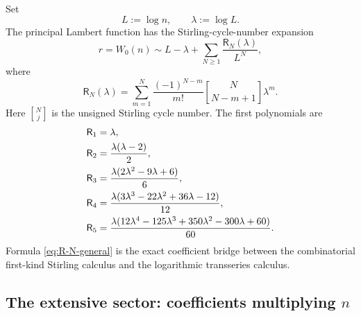 \documentclass[11pt,a4paper]{article}
\theoremstyle{definition}
\theoremstyle{remark}
\newcommand{\Sone}[2]{\genfrac{[}{]}{0pt}{}{#1}{#2}}
\newcommand{\cR}{\mathsf R}
\begin{document}
Set
\begin{equation}\label{eq:L-lambda}
  L:=\log n,
  \qquad \lambda:=\log L.
\end{equation}
The principal Lambert function has the Stirling-cycle-number expansion
\begin{equation}\label{eq:W-polylog}
 r=W_0(n)
 \sim L-\lambda+\sum_{N\ge1}\frac{\cR_N(\lambda)}{L^N},
\end{equation}
where
\begin{equation}\label{eq:R-N-general}
 \boxed{
 \cR_N(\lambda)=
 \sum_{m=1}^{N}
 \frac{(-1)^{N-m}}{m!}
 \Sone{N}{N-m+1}\lambda^m.}
\end{equation}
Here \(\Sone{N}{j}\) is the unsigned Stirling cycle number.  The first
polynomials are
\begin{align}
 \cR_1&=\lambda,\notag\\
 \cR_2&=\frac{\lambda(\lambda-2)}2,\notag\\
 \cR_3&=\frac{\lambda(2\lambda^2-9\lambda+6)}6,\notag\\
 \cR_4&=\frac{\lambda(3\lambda^3-22\lambda^2+36\lambda-12)}{12},
 \label{eq:R-first}\\
 \cR_5&=\frac{\lambda(12\lambda^4-125\lambda^3+350\lambda^2
                         -300\lambda+60)}{60}.\notag
\end{align}
Formula \cref{eq:R-N-general} is the exact coefficient bridge between the
combinatorial first-kind Stirling calculus and the logarithmic transseries
calculus.

\subsection{The extensive sector: coefficients multiplying \texorpdfstring{\(n\)}{n}}
\end{document}

